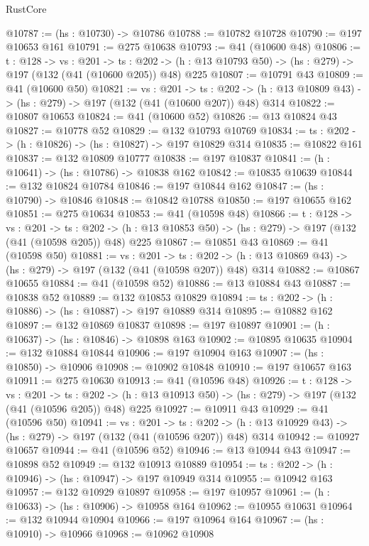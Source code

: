 \begin{lexlean}{RustCore}
\begin{coremodule}
@10787 := (hs : @10730) -> @10786
@10788 := @10782 @10728
@10790 := @197 @10653 @161
@10791 := @275 @10638
@10793 := @41 (@10600 @48)
@10806 := {t : @128} ->
  {vs : @201} ->
  {ts : @202} -> (h : @13 @10793 @50) -> (hs : @279) -> @197 (@132 (@41 (@10600 @205)) @48) @225
@10807 := @10791 @43
@10809 := @41 (@10600 @50)
@10821 := {vs : @201} ->
  {ts : @202} -> (h : @13 @10809 @43) -> (hs : @279) -> @197 (@132 (@41 (@10600 @207)) @48) @314
@10822 := @10807 @10653
@10824 := @41 (@10600 @52)
@10826 := @13 @10824 @43
@10827 := @10778 @52
@10829 := @132 @10793 @10769
@10834 := {ts : @202} -> (h : @10826) -> (hs : @10827) -> @197 @10829 @314
@10835 := @10822 @161
@10837 := @132 @10809 @10777
@10838 := @197 @10837
@10841 := (h : @10641) -> (hs : @10786) -> @10838 @162
@10842 := @10835 @10639
@10844 := @132 @10824 @10784
@10846 := @197 @10844 @162
@10847 := (hs : @10790) -> @10846
@10848 := @10842 @10788
@10850 := @197 @10655 @162
@10851 := @275 @10634
@10853 := @41 (@10598 @48)
@10866 := {t : @128} ->
  {vs : @201} ->
  {ts : @202} -> (h : @13 @10853 @50) -> (hs : @279) -> @197 (@132 (@41 (@10598 @205)) @48) @225
@10867 := @10851 @43
@10869 := @41 (@10598 @50)
@10881 := {vs : @201} ->
  {ts : @202} -> (h : @13 @10869 @43) -> (hs : @279) -> @197 (@132 (@41 (@10598 @207)) @48) @314
@10882 := @10867 @10655
@10884 := @41 (@10598 @52)
@10886 := @13 @10884 @43
@10887 := @10838 @52
@10889 := @132 @10853 @10829
@10894 := {ts : @202} -> (h : @10886) -> (hs : @10887) -> @197 @10889 @314
@10895 := @10882 @162
@10897 := @132 @10869 @10837
@10898 := @197 @10897
@10901 := (h : @10637) -> (hs : @10846) -> @10898 @163
@10902 := @10895 @10635
@10904 := @132 @10884 @10844
@10906 := @197 @10904 @163
@10907 := (hs : @10850) -> @10906
@10908 := @10902 @10848
@10910 := @197 @10657 @163
@10911 := @275 @10630
@10913 := @41 (@10596 @48)
@10926 := {t : @128} ->
  {vs : @201} ->
  {ts : @202} -> (h : @13 @10913 @50) -> (hs : @279) -> @197 (@132 (@41 (@10596 @205)) @48) @225
@10927 := @10911 @43
@10929 := @41 (@10596 @50)
@10941 := {vs : @201} ->
  {ts : @202} -> (h : @13 @10929 @43) -> (hs : @279) -> @197 (@132 (@41 (@10596 @207)) @48) @314
@10942 := @10927 @10657
@10944 := @41 (@10596 @52)
@10946 := @13 @10944 @43
@10947 := @10898 @52
@10949 := @132 @10913 @10889
@10954 := {ts : @202} -> (h : @10946) -> (hs : @10947) -> @197 @10949 @314
@10955 := @10942 @163
@10957 := @132 @10929 @10897
@10958 := @197 @10957
@10961 := (h : @10633) -> (hs : @10906) -> @10958 @164
@10962 := @10955 @10631
@10964 := @132 @10944 @10904
@10966 := @197 @10964 @164
@10967 := (hs : @10910) -> @10966
@10968 := @10962 @10908

\end{coremodule}
\end{lexlean}
